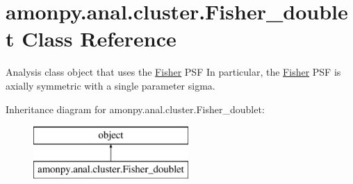 \hypertarget{classamonpy_1_1anal_1_1cluster_1_1_fisher__doublet}{\section{amonpy.\-anal.\-cluster.\-Fisher\-\_\-doublet Class Reference}
\label{classamonpy_1_1anal_1_1cluster_1_1_fisher__doublet}
}


Analysis class object that uses the \hyperlink{classamonpy_1_1anal_1_1cluster_1_1_fisher}{Fisher} P\-S\-F In particular, the \hyperlink{classamonpy_1_1anal_1_1cluster_1_1_fisher}{Fisher} P\-S\-F is axially symmetric with a single parameter sigma.  


Inheritance diagram for amonpy.\-anal.\-cluster.\-Fisher\-\_\-doublet\-:\begin{figure}[H]
\begin{center}
\leavevmode
\includegraphics[height=2.000000cm]{da/d5e/classamonpy_1_1anal_1_1cluster_1_1_fisher__doublet}
\end{center}
\end{figure}
